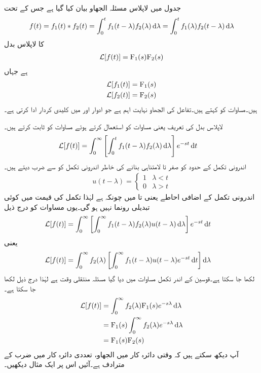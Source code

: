 جدول  میں لاپلاس مسئلہ الجھاو بیان کیا گیا ہے جس کے تحت 
\begin{align}\label{مساوات_لاپلاس_الجھاو_تعریف}
f(t)=f_1(t) \ast f_2(t)=\int_0^t f_1(t-\lambda)f_2(\lambda)\dif \lambda=\int_0^t f_1(\lambda)f_2(t-\lambda)\dif \lambda
\end{align}
کا لاپلاس بدل
\begin{align}\label{مساوات_لاپلاس_مسئلہ_الجھاو_تعریف}
\mathcal{L}[f(t)]={{\textup{F}}}_1(s){{\textup{F}}}_2(s)
\end{align}
ہے جہاں
\begin{align*}
\mathcal{L}[f_1(t)]&={{\textup{F}}}_1(s)\\
\mathcal{L}[f_2(t)]&={{\textup{F}}}_2(s)
\end{align*}
 ہیں۔مساوات  کو  کہتے ہیں۔تفاعل کی الجھاو نہایت اہم ہے جو ادوار اور   میں کلیدی کردار ادا کرتی ہے۔

لاپلاس بدل کی تعریف یعنی مساوات  کو استعمال کرتے ہوئے مساوات  کو ثابت کرتے ہیں۔
\begin{align}\label{مساوات_لاپلاس_الجھاو_الف}
\Laplace[f(t)]&=\int_0^{\infty}\left[\int_0^t f_1(t-\lambda)f_2(\lambda) \dif \lambda\right]e^{-st}\dif t
\end{align}
اندرونی تکمل کے حدود کو صفر تا لامتناہی بنانے کی خاطر اندرونی تکمل کو  سے ضرب دیتے ہیں۔
\begin{align*}
u(t-\lambda)=
\begin{cases}
1& \lambda<t\\
0&\lambda>t
\end{cases}
\end{align*}
اندرونی تکمل کے اضافی احاطے یعنی  تا  میں چونکہ  ہے لہٰذا تکمل کی قیمت میں کوئی تبدیلی رونما نہیں ہو گی۔یوں مساوات  کو درج ذیل
\begin{align*}
\Laplace[f(t)]&=\int_0^{\infty}\left[\int_0^{\infty} f_1(t-\lambda)f_2(\lambda) u(t-\lambda) \dif \lambda\right]e^{-st}\dif t
\end{align*}
یعنی
\begin{align*}
\Laplace[f(t)]&=\int_0^{\infty}f_2(\lambda)\left[\int_0^{\infty} f_1(t-\lambda) u(t-\lambda) e^{-st}\dif t\right]\dif \lambda
\end{align*}
لکھا جا سکتا ہے۔قوسین کے اندر تکمل مساوات  میں دیا گیا مسئلہ منتقلی وقت ہے لہٰذا درج ذیل لکھا جا سکتا ہے۔
 \begin{align*}
\Laplace[f(t)]&=\int_0^{\infty}f_2(\lambda)\bF_1(s)e^{-s \lambda}\dif \lambda\\
&=\bF_1(s)\int_0^{\infty} f_2(\lambda) e^{-s\lambda} \dif \lambda\\
&=\bF_1(s) \bF_2(s)
\end{align*}
آپ دیکھ سکتے ہیں کہ وقتی دائرہ کار میں الجھاو، تعددی دائرہ کار میں ضرب کے مترادف ہے۔آئیں اس پر ایک مثال دیکھیں۔


